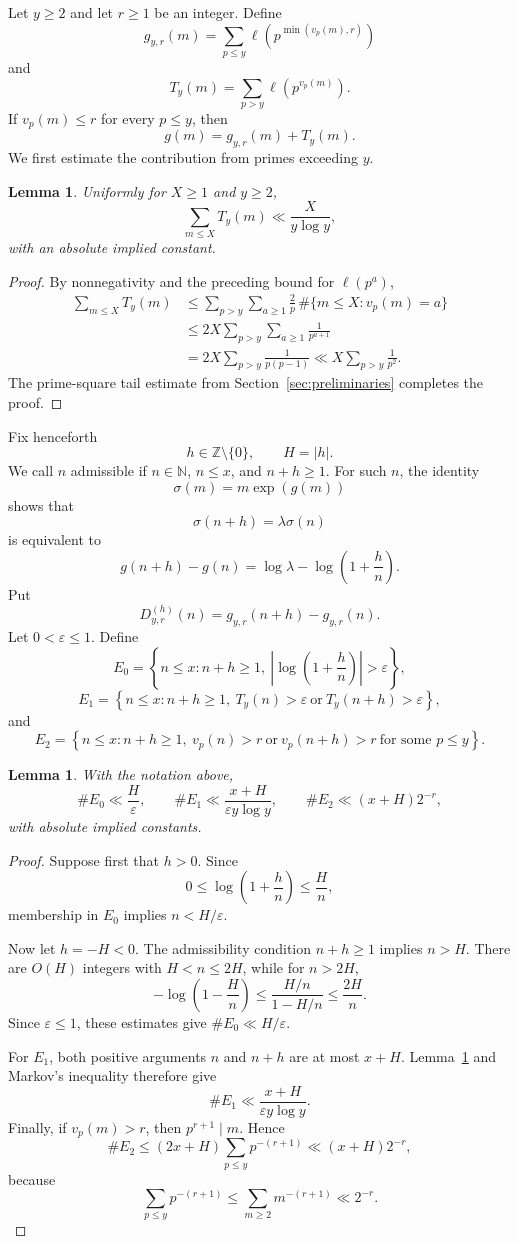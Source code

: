 \documentclass[11pt,reqno]{amsart}
\numberwithin{equation}{section}
\theoremstyle{plain}
\newtheorem{lemma}[theorem]{Lemma}
\theoremstyle{definition}
\theoremstyle{remark}
\newcommand{\N}{\mathbb N}
\newcommand{\Z}{\mathbb Z}
\begin{document}
Let $y\ge2$ and let $r\ge1$ be an integer. Define
\[
g_{y,r}(m)
=
\sum_{p\le y}\ell\!\left(p^{\min(v_p(m),r)}\right)
\]
and
\[
T_y(m)=\sum_{p>y}\ell\!\left(p^{v_p(m)}\right).
\]
If $v_p(m)\le r$ for every $p\le y$, then
\[
g(m)=g_{y,r}(m)+T_y(m).
\]
We first estimate the contribution from primes exceeding $y$.

\begin{lemma}\label{lem:large-prime-tail}
Uniformly for $X\ge1$ and $y\ge2$,
\[
\sum_{m\le X}T_y(m)\ll\frac{X}{y\log y},
\]
with an absolute implied constant.
\end{lemma}
\begin{proof}
By nonnegativity and the preceding bound for $\ell(p^a)$,
\[
\begin{aligned}
\sum_{m\le X}T_y(m)
&\le
\sum_{p>y}\sum_{a\ge1}\frac2p\,\#\{m\le X:v_p(m)=a\}\\
&\le
2X\sum_{p>y}\sum_{a\ge1}\frac1{p^{a+1}}\\
&=
2X\sum_{p>y}\frac1{p(p-1)}
\ll
X\sum_{p>y}\frac1{p^2}.
\end{aligned}
\]
The prime-square tail estimate from
Section~\ref{sec:preliminaries} completes the proof.
\end{proof}

Fix henceforth
\[
h\in\Z\setminus\{0\},\qquad H=|h|.
\]
We call $n$ admissible if $n\in\N$, $n\le x$, and $n+h\ge1$.
For such $n$, the identity
\[
\sigma(m)=m\exp(g(m))
\]
shows that
\[
\sigma(n+h)=\lambda\sigma(n)
\]
is equivalent to
\[
g(n+h)-g(n)=\log\lambda-\log\left(1+\frac hn\right).
\]
Put
\[
D^{(h)}_{y,r}(n)=g_{y,r}(n+h)-g_{y,r}(n).
\]
Let $0<\varepsilon\le1$. Define
\[
E_0
=
\left\{n\le x:n+h\ge1,\ \left|\log\left(1+\frac hn\right)\right|>\varepsilon\right\},
\]
\[
E_1
=
\left\{n\le x:n+h\ge1,\ T_y(n)>\varepsilon\ \text{or}\ T_y(n+h)>\varepsilon\right\},
\]
and
\[
E_2
=
\left\{n\le x:n+h\ge1,\ v_p(n)>r\ \text{or}\ v_p(n+h)>r\ \text{for some }p\le y\right\}.
\]

\begin{lemma}\label{lem:exceptional-sets}
With the notation above,
\[
\#E_0\ll\frac{H}{\varepsilon},
\qquad
\#E_1\ll\frac{x+H}{\varepsilon y\log y},
\qquad
\#E_2\ll(x+H)2^{-r},
\]
with absolute implied constants.
\end{lemma}
\begin{proof}
Suppose first that $h>0$. Since
\[
0\le\log\left(1+\frac hn\right)\le\frac Hn,
\]
membership in $E_0$ implies $n<H/\varepsilon$.

Now let $h=-H<0$. The admissibility condition $n+h\ge1$ implies $n>H$. There are $O(H)$ integers with $H<n\le2H$, while for $n>2H$,
\[
-\log\left(1-\frac Hn\right)
\le
\frac{H/n}{1-H/n}
\le
\frac{2H}{n}.
\]
Since $\varepsilon\le1$, these estimates give $\#E_0\ll H/\varepsilon$.

For $E_1$, both positive arguments $n$ and $n+h$ are at most $x+H$. Lemma~\ref{lem:large-prime-tail} and Markov's inequality therefore give
\[
\#E_1\ll\frac{x+H}{\varepsilon y\log y}.
\]
Finally, if $v_p(m)>r$, then $p^{r+1}\mid m$. Hence
\[
\#E_2
\le
(2x+H)\sum_{p\le y}p^{-(r+1)}
\ll
(x+H)2^{-r},
\]
because
\[
\sum_{p\le y}p^{-(r+1)}\le\sum_{m\ge2}m^{-(r+1)}\ll2^{-r}.
\]
\end{proof}
\end{document}
